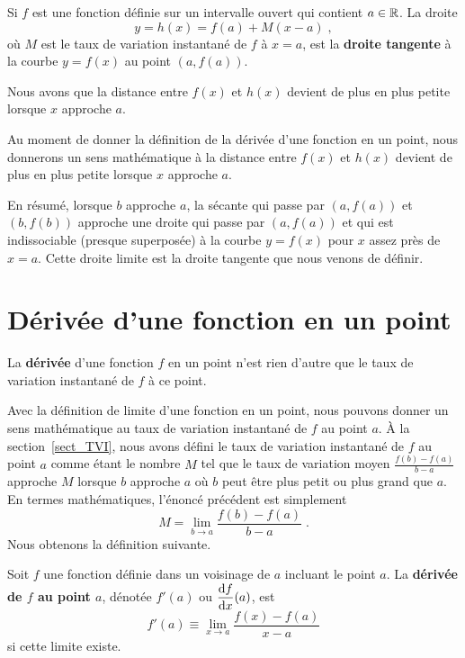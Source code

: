 {

\begin{focus}{\dfn} 
Si $f$ est une fonction définie sur un intervalle ouvert qui contient
$a \in \mathbb{R}$.  La droite
\[
y = h(x) = f(a) + M(x-a) \; ,
\]
où $M$ est le taux de variation instantané de $f$ à $x=a$, est la
{\bfseries droite tangente} à la courbe
$y=f(x)$ au point $(a,f(a))$.

Nous avons que la distance entre $f(x)$ et $h(x)$ devient de plus en plus
petite lorsque $x$ approche $a$.
\end{focus}

Au moment de donner la définition de la dérivée d'une fonction en un
point, nous donnerons un sens mathématique à \lgm la distance entre $f(x)$
et $h(x)$ devient de plus en plus petite lorsque $x$ approche $a$\rgm.

En résumé, lorsque $b$ approche $a$, la sécante qui passe par
$(a,f(a))$ et $(b,f(b))$ approche une droite qui passe par $(a,f(a))$
et qui est indissociable (presque superposée) à la courbe $y=f(x)$
pour $x$ assez près de $x=a$.  Cette droite limite est la droite
tangente que nous venons de définir.

\section{Dérivée d'une fonction en un point}\label{def_der}

La {\bfseries dérivée} d'une fonction $f$ en un point n'est
rien d'autre que le taux de variation instantané de $f$ à ce point.

Avec la définition de limite d'une fonction en un point, nous pouvons
donner un sens mathéma\-tique au taux de variation instantané de $f$
au point $a$.  À la section~\ref{sect_TVI}, nous avons défini le taux de
variation instantané de $f$ au point $a$ comme étant le nombre $M$ tel
que le taux de variation moyen $\displaystyle \frac{f(b)-f(a)}{b-a}$
approche $M$ lorsque $b$ approche $a$ où $b$ peut être plus petit ou
plus grand que $a$.  En termes mathématiques, l'énoncé précédent est
simplement
\[
M = \lim_{b\rightarrow a} \frac{f(b)-f(a)}{b-a} \; .
\]
Nous obtenons la définition suivante.

\begin{focus}{\dfn} 
Soit $f$ une fonction définie dans un voisinage de $a$ incluant le
point $a$.  La {\bfseries dérivée de $f$ au point $a$}, dénotée
$f'(a)$ ou $\displaystyle \frac{\mathrm{d}f}{\mathrm{d}x}(a)$, est
\[
f'(a) \equiv \lim_{x\rightarrow a} \frac{f(x) - f(a)}{x-a}
\]
si cette limite existe.


\end{focus}}
